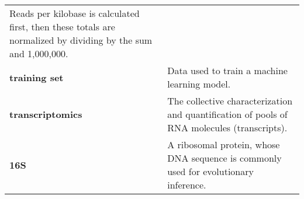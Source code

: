\begin{singlespace}
\begin{longtable}{ p{}  p{} }
	Reads per kilobase is calculated first, then these totals are normalized by dividing by the sum and 1,000,000. \\
\textbf{training set} &  Data used to train a machine learning model. \\
\textbf{transcriptomics} & The collective characterization and quantification of pools of RNA molecules (transcripts). \\
\textbf{16S} & A ribosomal protein, whose DNA sequence is commonly used for evolutionary inference. \\

\end{longtable}
\end{singlespace}
